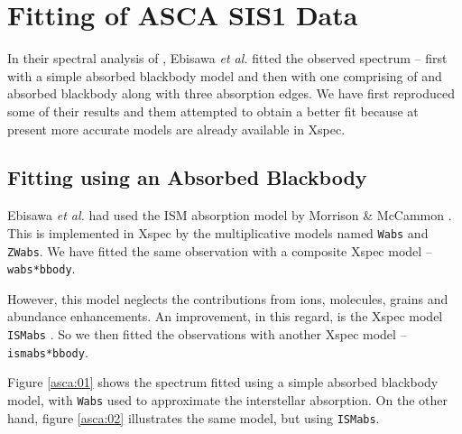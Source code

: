 		\section{Fitting of ASCA SIS1 Data} \label{continuum:asca}
			In their spectral analysis of \mrvel, Ebisawa \emph{et al.} fitted the observed spectrum -- first with a simple absorbed blackbody model and then with one comprising of and absorbed blackbody along with three absorption edges. We have first reproduced some of their results and them attempted to obtain a better fit because at present more accurate models are already available in Xspec.
			
			\subsection{Fitting using an Absorbed Blackbody} \label{continuum:asca:abs-bb}
				Ebisawa \emph{et al.} had used the ISM absorption model by Morrison \& McCammon \cite{morrison1983wabs}. This is implemented in Xspec by the multiplicative models named \texttt{Wabs} and \texttt{ZWabs}. We have fitted the same observation with a composite Xspec model -- \texttt{wabs*bbody}.
				
				However, this model neglects the contributions from ions, molecules, grains and abundance enhancements. An improvement, in this regard, is the Xspec model \texttt{ISMabs} \cite{ismabs_gatuzz}. So we then fitted the observations with another Xspec model -- \texttt{ismabs*bbody}.
				
				Figure \ref{asca:01} shows the spectrum fitted using a simple absorbed blackbody model, with \texttt{Wabs} used to approximate the interstellar absorption. On the other hand, figure \ref{asca:02} illustrates the same model, but using \texttt{ISMabs}.
				
